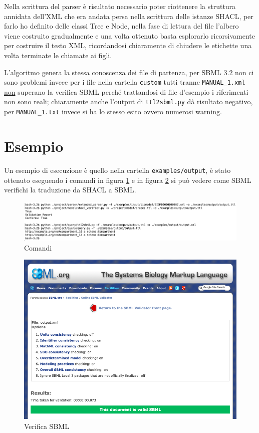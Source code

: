 \documentclass{article}
\begin{document}
Nella scrittura del parser è risultato necessario poter riottenere la struttura annidata dell'XML che era andata persa nella scrittura delle istanze SHACL, per farlo ho definito delle classi Tree e Node, nella fase di lettura del file l'albero viene costruito gradualmente e una volta ottenuto basta esplorarlo ricorsivamente per costruire il testo XML, ricordandosi chiaramente di chiudere le etichette una volta terminate le chiamate ai figli. 

L'algoritmo genera la stessa conoscenza dei file di partenza, per SBML 3.2 non ci sono problemi invece per i file nella cartella \texttt{custom} tutti tranne \texttt{MANUAL\_1.xml} \underline{non} superano la verifica SBML perché trattandosi di file d'esempio i riferimenti non sono reali; chiaramente anche l'output di \texttt{ttl2sbml.py} dà risultato negativo, per \texttt{MANUAL\_1.txt} invece si ha lo stesso esito ovvero numerosi warning.

\section{Esempio}
Un esempio di esecuzione è quello nella cartella \texttt{examples/output}, è stato ottenuto eseguendo i comandi in figura \ref{fig:example_commands} e in figura \ref{fig:example_validation} si può vedere come SBML verifichi la traduzione da SHACL a SBML.

\begin{figure}[h!t]
    \caption{Comandi}
    \label{fig:example_commands}
    \includegraphics[scale=0.366]{images/example_commands.png}
\end{figure}

\begin{figure}[H]
    \caption{Verifica SBML}
    \label{fig:example_validation}
    \includegraphics[scale=0.43]{images/example_validation.png}
\end{figure}
\end{document}
